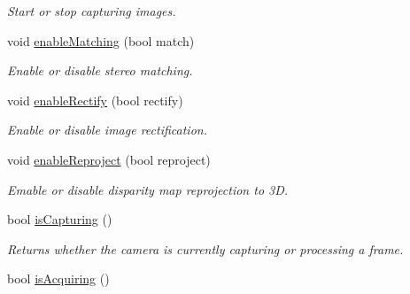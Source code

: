 \begin{DoxyCompactItemize}
\begin{DoxyCompactList}\small\item\em Start or stop capturing images. \end{DoxyCompactList}\item 
\hypertarget{class_abstract_stereo_camera_a0d63f01457d134b1f83d7c6c11e42010}{}void \hyperlink{class_abstract_stereo_camera_a0d63f01457d134b1f83d7c6c11e42010}{enable\+Matching} (bool match)\label{class_abstract_stereo_camera_a0d63f01457d134b1f83d7c6c11e42010}

\begin{DoxyCompactList}\small\item\em Enable or disable stereo matching. \end{DoxyCompactList}\item 
\hypertarget{class_abstract_stereo_camera_a16cb90b828f6f4d4e32a8df9d8b8be0f}{}void \hyperlink{class_abstract_stereo_camera_a16cb90b828f6f4d4e32a8df9d8b8be0f}{enable\+Rectify} (bool rectify)\label{class_abstract_stereo_camera_a16cb90b828f6f4d4e32a8df9d8b8be0f}

\begin{DoxyCompactList}\small\item\em Enable or disable image rectification. \end{DoxyCompactList}\item 
\hypertarget{class_abstract_stereo_camera_ae3dec6f756ff3b6d3702ff3d85e95272}{}void \hyperlink{class_abstract_stereo_camera_ae3dec6f756ff3b6d3702ff3d85e95272}{enable\+Reproject} (bool reproject)\label{class_abstract_stereo_camera_ae3dec6f756ff3b6d3702ff3d85e95272}

\begin{DoxyCompactList}\small\item\em Emable or disable disparity map reprojection to 3\+D. \end{DoxyCompactList}\item 
\hypertarget{class_abstract_stereo_camera_a01c48565e18ae2ac7ea4f3322c2e5059}{}bool \hyperlink{class_abstract_stereo_camera_a01c48565e18ae2ac7ea4f3322c2e5059}{is\+Capturing} ()\label{class_abstract_stereo_camera_a01c48565e18ae2ac7ea4f3322c2e5059}

\begin{DoxyCompactList}\small\item\em Returns whether the camera is currently capturing or processing a frame. \end{DoxyCompactList}\item 
\hypertarget{class_abstract_stereo_camera_a490db3572c901f51f49d90016f856805}{}bool \hyperlink{class_abstract_stereo_camera_a490db3572c901f51f49d90016f856805}{is\+Acquiring} ()\label{class_abstract_stereo_camera_a490db3572c901f51f49d90016f856805}


\end{DoxyCompactItemize}
